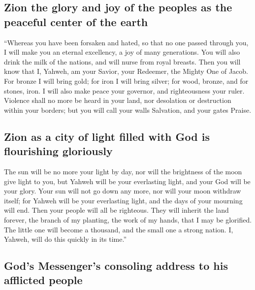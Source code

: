 \hypertarget{zion-the-glory-and-joy-of-the-peoples-as-the-peaceful-center-of-the-earth}{%
\subsection{Zion the glory and joy of the peoples as the peaceful center
of the
earth}\label{zion-the-glory-and-joy-of-the-peoples-as-the-peaceful-center-of-the-earth}}

 ``Whereas you have been forsaken and hated, so that no
one passed through you, I will make you an eternal excellency, a joy of
many generations.  You will also drink the milk of the
nations, and will nurse from royal breasts. Then you will know that I,
Yahweh, am your Savior, your Redeemer, the Mighty One of Jacob.
 For bronze I will bring gold; for iron I will bring
silver; for wood, bronze, and for stones, iron. I will also make peace
your governor, and righteousness your ruler.  Violence
shall no more be heard in your land, nor desolation or destruction
within your borders; but you will call your walls Salvation, and your
gates Praise.

\hypertarget{zion-as-a-city-of-light-filled-with-god-is-flourishing-gloriously}{%
\subsection{Zion as a city of light filled with God is flourishing
gloriously}\label{zion-as-a-city-of-light-filled-with-god-is-flourishing-gloriously}}

 The sun will be no more your light by day, nor will the
brightness of the moon give light to you, but Yahweh will be your
everlasting light, and your God will be your glory.  Your
sun will not go down any more, nor will your moon withdraw itself; for
Yahweh will be your everlasting light, and the days of your mourning
will end.  Then your people will all be righteous. They
will inherit the land forever, the branch of my planting, the work of my
hands, that I may be glorified.  The little one will
become a thousand, and the small one a strong nation. I, Yahweh, will do
this quickly in its time.''

\hypertarget{gods-messengers-consoling-address-to-his-afflicted-people}{%
\subsection{God's Messenger's consoling address to his afflicted
people}\label{gods-messengers-consoling-address-to-his-afflicted-people}}

